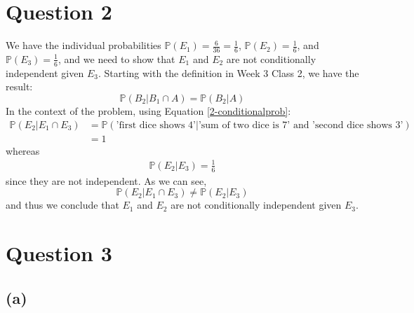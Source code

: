 \documentclass[12pt]{article}
\begin{document}
\newpage

\section*{Question 2}

We have the individual probabilities $ \mathbb{P}(E_{1}) = \frac{6}{36} = \frac{1}{6}$, $ \mathbb{P}(E_{2}) = \frac{1}{6}$, and $ \mathbb{P}(E_{3}) = \frac{1}{6}$, and we need to show that $E_{1}$ and $E_{2}$ are not conditionally independent given $E_{3}$. Starting with the definition in Week 3 Class 2, we have the result: \begin{equation}\label{2-conditionalprob}
    \mathbb{P}(B_{2} | B_{1} \cap A) = \mathbb{P}(B_{2} | A)
\end{equation} In the context of the problem, using Equation \ref{2-conditionalprob}: \begin{align*}
    \mathbb{P}(E_{2} | E_{1} \cap E_{3}) &= \mathbb{P}(\text{'first dice shows 4'} | \text{'sum of two dice is 7' and 'second dice shows 3'}) \\ 
    &= 1
\end{align*} whereas \begin{align*}
    \mathbb{P}(E_{2} | E_{3}) = \frac{1}{6}
\end{align*} since they are not independent. As we can see, \begin{equation*}
    \mathbb{P}(E_{2} | E_{1} \cap E_{3}) \neq \mathbb{P}(E_{2} | E_{3})
\end{equation*} and thus we conclude that $E_{1}$ and $E_{2}$ are not conditionally independent given $E_{3}$.

\newpage 

\section*{Question 3}

\subsection*{(a)}
\end{document}
